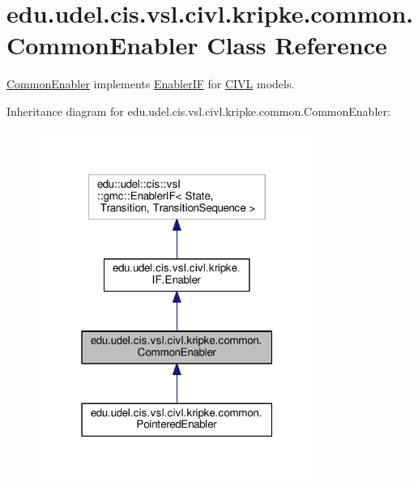 \hypertarget{classedu_1_1udel_1_1cis_1_1vsl_1_1civl_1_1kripke_1_1common_1_1CommonEnabler}{}\section{edu.\+udel.\+cis.\+vsl.\+civl.\+kripke.\+common.\+Common\+Enabler Class Reference}
\label{classedu_1_1udel_1_1cis_1_1vsl_1_1civl_1_1kripke_1_1common_1_1CommonEnabler}


\hyperlink{classedu_1_1udel_1_1cis_1_1vsl_1_1civl_1_1kripke_1_1common_1_1CommonEnabler}{Common\+Enabler} implements \hyperlink{}{Enabler\+I\+F} for \hyperlink{classedu_1_1udel_1_1cis_1_1vsl_1_1civl_1_1CIVL}{C\+I\+V\+L} models.  




Inheritance diagram for edu.\+udel.\+cis.\+vsl.\+civl.\+kripke.\+common.\+Common\+Enabler\+:
\nopagebreak
\begin{figure}[H]
\begin{center}
\leavevmode
\includegraphics[width=256pt]{classedu_1_1udel_1_1cis_1_1vsl_1_1civl_1_1kripke_1_1common_1_1CommonEnabler__inherit__graph}
\end{center}
\end{figure}


